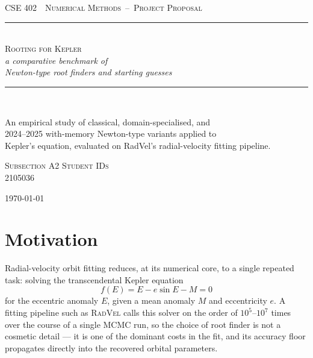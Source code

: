 \documentclass[11pt,a4paper]{article}
\begin{document}
\begin{titlepage}
\pagecolor{Paper}
\thispagestyle{empty}
\begin{center}
  \vspace*{1.6cm}
  {\color{Accent}\scshape\large CSE 402 \,\textbar\, Numerical Methods\, --\, Project Proposal}\\[0.6cm]
  {\color{Rule}\rule{0.55\textwidth}{0.8pt}}\\[1.1cm]

  {\color{Ink}\scshape\Huge Rooting for Kepler}\\[0.35cm]
  {\color{Muted}\Large\itshape a comparative benchmark of\\[2pt] Newton-type root finders and starting guesses}\\[1.4cm]

  {\color{Rule}\rule{0.32\textwidth}{0.6pt}}\\[1.1cm]

  \begin{minipage}{0.72\textwidth}
    \centering
    \small\color{Muted}
    An empirical study of classical, domain-specialised, and\\
    2024--2025 with-memory Newton-type variants applied to\\
    Kepler's equation, evaluated on RadVel's radial-velocity fitting pipeline.
  \end{minipage}

  \vspace{2.2cm}
  {\scshape\color{Accent}\footnotesize Subsection A2 \quad\textbar\quad Student IDs}\\[0.35cm]
  {\color{Ink}2105036    }

  \vfill
  {\footnotesize\color{Muted}\today}
\end{center}
\end{titlepage}

\setcounter{page}{1}

\section{Motivation}

Radial-velocity orbit fitting reduces, at its numerical core, to a single
repeated task: solving the transcendental Kepler equation
\[
  f(E) = E - e\sin E - M = 0
\]
for the eccentric anomaly $E$, given a mean anomaly $M$ and eccentricity
$e$. A fitting pipeline such as \textsc{RadVel} calls this solver on the
order of $10^5$--$10^7$ times over the course of a single MCMC run, so the
choice of root finder is not a cosmetic detail --- it is one of the
dominant costs in the fit, and its accuracy floor propagates directly into
the recovered orbital parameters.
\end{document}
